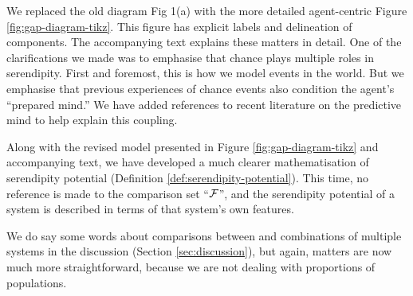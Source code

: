 

We replaced the old diagram Fig 1(a) with the more detailed
agent-centric Figure \ref{fig:gap-diagram-tikz}.  This figure has
explicit labels and delineation of components.  The accompanying text
explains these matters in detail.
%
%
One of the clarifications we made was to emphasise that chance plays
multiple roles in serendipity.  First and foremost, this is how we
model events in the world.  But we emphasise that previous experiences
of chance events also condition the agent's ``prepared mind.''  We
have added references to recent literature on the predictive mind to
help explain this coupling.

Along with the revised model presented in Figure
\ref{fig:gap-diagram-tikz} and accompanying text, we have developed a
much clearer mathematisation of serendipity potential (Definition
\ref{def:serendipity-potential}).  This time, no reference is made to
the comparison set ``$\cal{F}$'', and the serendipity potential of a
system is described in terms of that system's own features.

We do say some words about comparisons between and combinations of
multiple systems in the discussion (Section \ref{sec:discussion}), but
again, matters are now much more straightforward, because we are not
dealing with proportions of populations.

